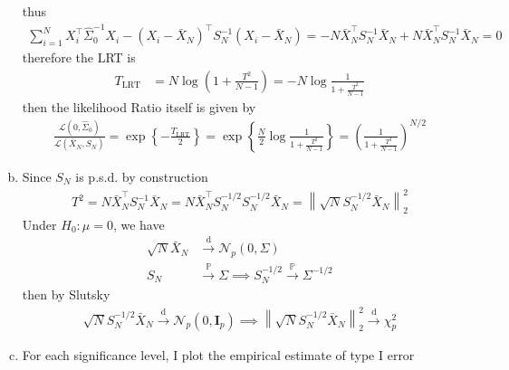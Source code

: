 \documentclass[10pt,notitlepage]{article}
\newcommand{\norm}[1]{\left\lVert #1\right\rVert}
\newcommand{\Id}{\mathbf{I}}
\begin{document}
\begin{exercise}[Solution]
\begin{enumerate}[(a)]
                    thus
                    \begin{align*}
                        \sum_{i=1}^{N} X_i^\top\hat{\Sigma}_0^{-1}X_i - \left(X_i-\bar{X}_N\right)^\top S_N^{-1}\left(X_i-\bar{X}_N\right) = - N \bar{X}_N^\top S_N^{-1}\bar{X}_N + N \bar{X}_N^\top S_N^{-1}\bar{X}_N = 0
                    \end{align*}
                    therefore the LRT is 
                    \begin{align*}
                        T_{\text{LRT}} &= N\log\left(1+\frac{T^2}{N-1}\right) = -N\log\frac{1}{1+\frac{T^2}{N-1}}
                    \end{align*}
                    then the likelihood Ratio itself is given by
                    \begin{align*}
                        \frac{\mathcal{L}\left(0,\hat{\Sigma}_0\right)}{\mathcal{L}\left(\bar{X}_N,S_N\right)} = \exp\left\{-\frac{T_{\text{LRT}}}{2}\right\} = \exp\left\{\frac{N}{2}\log\frac{1}{1+\frac{T^2}{N-1}}\right\} = \left(\frac{1}{1+\frac{T^2}{N-1}}\right)^{N/2}
                    \end{align*}
            \item Since $S_N$ is p.s.d. by construction
                    \begin{align*}
                        T^2 = N\bar{X}_N^\top S_N^{-1}\bar{X}_N = N\bar{X}_N^\top S_N^{-1/2} S_N^{-1/2}\bar{X}_N = \norm{\sqrt{N}S_N^{-1/2}\bar{X}_N}_2^2
                    \end{align*}
                    Under $H_0:\mu=0$, we have
                    \begin{align*}
                        \sqrt{N}\bar{X}_N&\overset{\text{d}}{\longrightarrow}\mathcal{N}_p(0,\Sigma)\\
                        S_N&\overset{\mathbb{P}}{\longrightarrow}\Sigma \implies S_N^{-1/2}\overset{\mathbb{P}}{\longrightarrow}\Sigma^{-1/2}
                    \end{align*}
                    then by Slutsky
                    \begin{align*}
                        \sqrt{N}S_N^{-1/2}\bar{X}_N\overset{\text{d}}{\longrightarrow}\mathcal{N}_p\left(0,\Id_p\right)\implies \norm{\sqrt{N}S_N^{-1/2}\bar{X}_N}_2^2\overset{\text{d}}{\longrightarrow}\chi^2_p
                    \end{align*}
            \item For each significance level, I plot the empirical estimate of type I error
                    \begin{center}

\end{center}
\end{enumerate}
\end{exercise}
\end{document}
